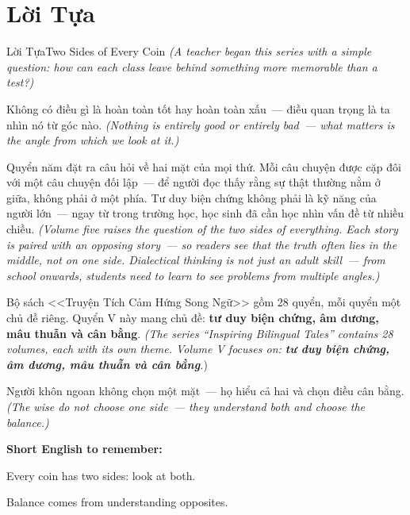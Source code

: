 \chapter*{Lời Tựa}

\begin{truyen}{Lời Tựa}{Two Sides of Every Coin}
\textit{(A teacher began this series with a simple question: how can each class leave behind something more memorable than a test?)}

Không có điều gì là hoàn toàn tốt hay hoàn toàn xấu~--- điều quan trọng là ta nhìn nó từ góc nào.
\textit{(Nothing is entirely good or entirely bad~--- what matters is the angle from which we look at it.)}

Quyển năm đặt ra câu hỏi về hai mặt của mọi thứ. Mỗi câu chuyện được cặp đôi với một câu chuyện đối lập~--- để người đọc thấy rằng sự thật thường nằm ở giữa, không phải ở một phía. Tư duy biện chứng không phải là kỹ năng của người lớn~--- ngay từ trong trường học, học sinh đã cần học nhìn vấn đề từ nhiều chiều.
\textit{(Volume five raises the question of the two sides of everything. Each story is paired with an opposing story~--- so readers see that the truth often lies in the middle, not on one side. Dialectical thinking is not just an adult skill~--- from school onwards, students need to learn to see problems from multiple angles.)}

Bộ sách <<Truyện Tích Cảm Hứng Song Ngữ>> gồm 28 quyển, mỗi quyển một chủ đề riêng. Quyển V này mang chủ đề: \textbf{tư duy biện chứng, âm dương, mâu thuẫn và cân bằng}.
\textit{(The series ``Inspiring Bilingual Tales'' contains 28 volumes, each with its own theme. Volume V focuses on: \textbf{tư duy biện chứng, âm dương, mâu thuẫn và cân bằng}.})
\end{truyen}

\begin{baihoc}
Người khôn ngoan không chọn một mặt~--- họ hiểu cả hai và chọn điều cân bằng.
\textit{(The wise do not choose one side~--- they understand both and choose the balance.)}
\end{baihoc}

\begin{tcolorbox}[
  colback=truyenblue!6, colframe=truyenblue,
  coltitle=white, fonttitle=\bfseries,
  title={Easy English},
  arc=4pt, boxrule=1pt, breakable, enhanced
]
\textbf{Short English to remember:}

Every coin has two sides: look at both.

Balance comes from understanding opposites.
\end{tcolorbox}

